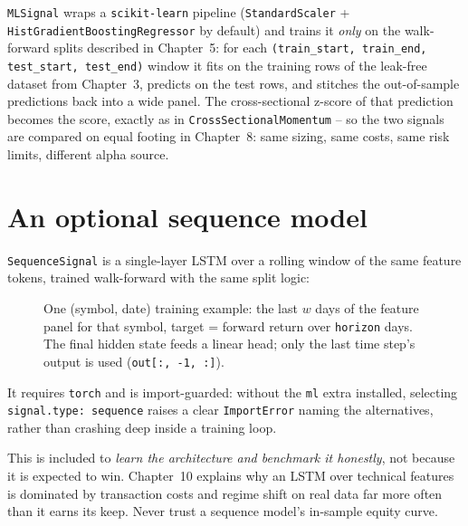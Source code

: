 \texttt{MLSignal} wraps a \texttt{scikit-learn} pipeline
(\texttt{StandardScaler} + \texttt{HistGradientBoostingRegressor} by default) and
trains it \emph{only} on the walk-forward splits described in Chapter~5: for
each \texttt{(train\_start, train\_end, test\_start, test\_end)} window it fits
on the training rows of the leak-free dataset from Chapter~3, predicts on the
test rows, and stitches the out-of-sample predictions back into a wide panel.
The cross-sectional z-score of that prediction becomes the score, exactly as in
\texttt{CrossSectionalMomentum} -- so the two signals are compared on equal
footing in Chapter~8: same sizing, same costs, same risk limits, different
alpha source.

\section{An optional sequence model}

\texttt{SequenceSignal} is a single-layer LSTM over a rolling window of the same
feature tokens, trained walk-forward with the same split logic:

\begin{figure}[h]
\centering
{}
\caption{One (symbol, date) training example: the last $w$ days of the feature
panel for that symbol, target = forward return over \texttt{horizon} days. The
final hidden state feeds a linear head; only the last time step's output is
used (\texttt{out[:, -1, :]}).}
\end{figure}

It requires \texttt{torch} and is import-guarded: without the \texttt{ml} extra
installed, selecting \texttt{signal.type: sequence} raises a clear
\texttt{ImportError} naming the alternatives, rather than crashing deep inside a
training loop.

\begin{caveat}
This is included to \emph{learn the architecture and benchmark it honestly},
not because it is expected to win. Chapter~10 explains why an LSTM over
technical features is dominated by transaction costs and regime shift on real
data far more often than it earns its keep. Never trust a sequence model's
in-sample equity curve.
\end{caveat}
